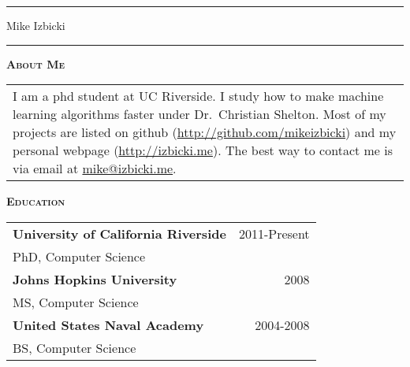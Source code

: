 \documentclass[12pt]{article}
\begin{document}
\noindent\rule{\textwidth}{1pt}
\begin{center}
\LARGE
\vspace{-0.15in}
Mike Izbicki
\end{center}
\vspace{-0.15in}
\noindent\rule{\textwidth}{1pt}
\vspace{0.05in}

\noindent
{{\scshape \bfseries {About Me}}}
\vspace{0.05in}

\noindent
\begin{tabularx}{\textwidth}{X}
I am a phd student at UC Riverside.
I study how to make machine learning algorithms faster under Dr.\ Christian Shelton.
Most of my projects are listed on github (\url{http://github.com/mikeizbicki}) and my personal webpage (\url{http://izbicki.me}).
The best way to contact me is via email at \url{mike@izbicki.me}.
\end{tabularx}


\vspace{0.15in}
\noindent
{{\scshape \bfseries {Education}}}
\vspace{0.05in}


\noindent
\begin{tabularx}{\textwidth}{Xr}
\textbf{University of California Riverside} & 2011-Present \\
PhD, Computer Science \vspace{0.05in}& \\

\textbf{Johns Hopkins University} & 2008 \\
MS, Computer Science \vspace{0.05in}& \\

\textbf{United States Naval Academy} & 2004-2008 \\
BS, Computer Science \vspace{0.05in}& \\

\end{tabularx}
\end{document}
